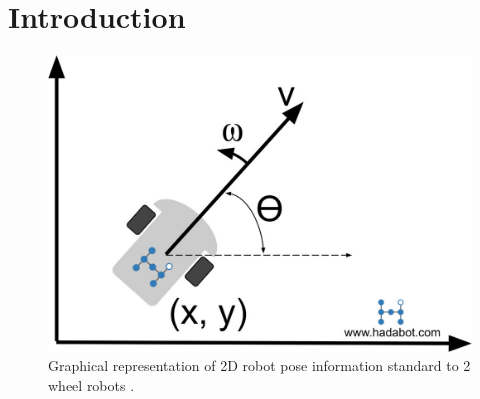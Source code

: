 \documentclass[conference]{IEEEtran}
\begin{document}
\section{Introduction}
\begin{figure}
	\includegraphics[width=\linewidth]{hadabot_unicycle_diagram_01.jpg}
	\caption{Graphical representation of 2D robot pose information standard to 2 wheel robots \cite{RN109}.}
\end{figure}
\end{document}
